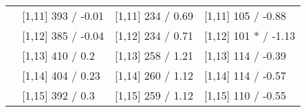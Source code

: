 \begin{table}
\begin{tabular}[t]{llll}
 & {}[1,11] 393  / -0.01 & {}[1,11] 234  / 0.69 & {}[1,11] 105  / -0.88\\
 & {}[1,12] 385  / -0.04 & {}[1,12] 234  / 0.71 & {}[1,12] 101 * / -1.13\\
\addlinespace
 & {}[1,13] 410  / 0.2 & {}[1,13] 258  / 1.21 & {}[1,13] 114  / -0.39\\
 & {}[1,14] 404  / 0.23 & {}[1,14] 260  / 1.12 & {}[1,14] 114  / -0.57\\
 & {}[1,15] 392  / 0.3 & {}[1,15] 259  / 1.12 & {}[1,15] 110  / -0.55\\
\bottomrule
\end{tabular}
\end{table}
